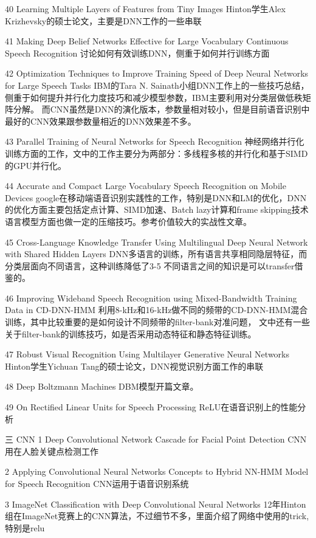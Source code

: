 40 Learning Multiple Layers of Features from Tiny Images
   Hinton学生Alex Krizhevsky的硕士论文，主要是DNN工作的一些串联

41 Making Deep Belief Networks Effective for Large Vocabulary Continuous Speech Recognition
   讨论如何有效训练DNN，侧重于如何并行训练方面

42 Optimization Techniques to Improve Training Speed of Deep Neural Networks for Large Speech Tasks
   IBM的Tara N. Sainath小组DNN工作上的一些技巧总结，侧重于如何提升并行化力度技巧和减少模型参数，IBM主要利用对分类层做低秩矩阵分解。
   而CNN虽然是DNN的演化版本，参数量相对较小，但是目前语音识别中最好的CNN效果跟参数量相近的DNN效果差不多。

43 Parallel Training of Neural Networks for Speech Recognition
   神经网络并行化训练方面的工作，文中的工作主要分为两部分：多线程多核的并行化和基于SIMD的GPU并行化。

44 Accurate and Compact Large Vocabulary Speech Recognition on Mobile Devices
   google在移动端语音识别实践性的工作，特别是DNN和LM的优化，DNN的优化方面主要包括定点计算、SIMD加速、Batch lazy计算和frame skipping技术
   语言模型方面也做一定的压缩技巧。参考价值较大的实战性文章。

45 Cross-Language Knowledge Transfer Using Multilingual Deep Neural Network with Shared Hidden Layers
   DNN多语言的训练，所有语言共享相同隐层特征，而分类层面向不同语言，这种训练降低了3-5%
   不同语言之间的知识是可以transfer借鉴的。

46 Improving Wideband Speech Recognition using Mixed-Bandwidth Training Data in CD-DNN-HMM
   利用8-kHz和16-kHz做不同的频带的CD-DNN-HMM混合训练，其中比较重要的是如何设计不同频带的filter-bank对准问题，
   文中还有一些关于filter-bank的训练技巧，如是否采用动态特征和静态特征训练。

47 Robust Visual Recognition Using Multilayer Generative Neural Networks
   Hinton学生Yichuan Tang的硕士论文，DNN视觉识别方面工作的串联

48 Deep Boltzmann Machines
   DBM模型开篇文章。

49 On Rectified Linear Units for Speech Processing
   ReLU在语音识别上的性能分析


三 CNN
1 Deep Convolutional Network Cascade for Facial Point Detection
  CNN用在人脸关键点检测工作

2 Applying Convolutional Neural Networks Concepts to Hybrid NN-HMM Model for Speech Recognition
  CNN运用于语音识别系统

3 ImageNet Classification with Deep Convolutional Neural Networks
  12年Hinton组在ImageNet竞赛上的CNN算法，不过细节不多，里面介绍了网络中使用的trick,特别是relu

